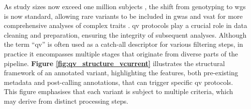 
As study sizes now exceed one million subjects \cite{lee2018gene, jansen2019genome}, the shift from genotyping to \ac{wgs} is now standard, allowing rare variants to be included in \ac{gwas} and \ac{vsat} for more comprehensive analyses of complex traits \cite{manolio2009finding, young2019solving}. %
\ac{qv} protocols play a crucial role in data cleaning and preparation, ensuring the integrity of subsequent analyses. Although the term ``\ac{qv}'' is often used as a catch-all descriptor for various filtering steps, in practice it encompasses multiple stages that originate from diverse parts of the pipeline.
\textbf{Figure \ref{fig:qv_structure_vcurrent}} illustrates the structural framework of an annotated variant, highlighting the features, both pre-existing metadata and post-calling annotations, that can trigger specific \ac{qv} protocols. This figure emphasises that each variant is subject to multiple criteria, which may derive from distinct processing steps.

